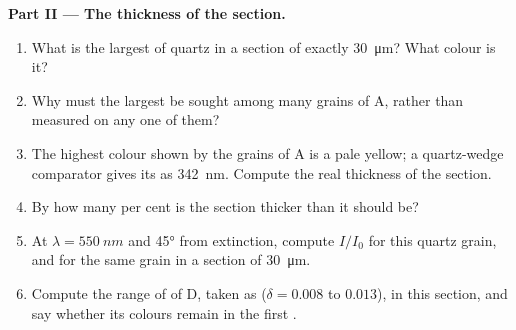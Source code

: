 \begin{problem}
\medskip
\noindent\textbf{Part II --- The thickness of the section.}
\begin{enumerate}[resume]
  \item What is the largest  of quartz in a section of exactly
        \qty{30}{\micro m}? What colour is it?
  \item Why must the largest  be sought among many grains of A,
        rather than measured on any one of them?
  \item The highest colour shown by the grains of A is a  pale
        yellow; a quartz-wedge comparator gives its  as
        \qty{342}{nm}. Compute the real thickness of the section.
  \item By how many per cent is the section thicker than it should be?
  \item At $\lambda = \qty{550}{nm}$ and \ang{45} from extinction, compute
        $I/I_0$ for this quartz grain, and for the same grain in a section of
        \qty{30}{\micro m}.
  \item Compute the range of  of D, taken as 
        ($\delta = 0.008$ to $0.013$), in this section, and say whether its
        colours remain in the first .
\end{enumerate}


\end{problem}
